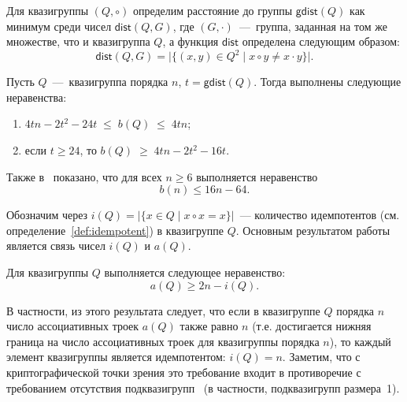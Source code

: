     \begin{definition}
        Для квазигруппы $(Q, \circ)$ определим расстояние до группы $\mathsf{gdist}(Q)$ как минимум среди чисел $\mathsf{dist}(Q, G)$, где $(G, \cdot)$~---~группа, заданная на том же множестве, что и квазигруппа $Q$, а функция $\mathsf{dist}$ определена следующим образом:
        \[
            \mathsf{dist}(Q, G) = \lvert \{(x, y) \in Q^2 \mid x \circ y \ne x \cdot y\} \rvert.
        \] 
    \end{definition}

    \begin{proposition}
        Пусть $Q$~---~квазигруппа порядка $n$, $t = \mathsf{gdist}(Q)$.
        Тогда выполнены следующие неравенства:
        \begin{enumerate}
            \item $4tn - 2t^2 - 24t \; \le \; b(Q) \; \le \; 4tn$;
            \item если $t \ge 24$, то $b(Q) \; \ge \; 4tn - 2t^2 - 16t$.
        \end{enumerate}
    \end{proposition}
    Также в~\cite{drapal1983quasigroups} показано, что для всех $n \ge 6$ выполняется неравенство 
    \[
        b(n) \le 16n - 64.
    \]

    Обозначим через $i(Q) = \lvert \{x \in Q \mid x \circ x = x\} \rvert$~--- количество идемпотентов (см. определение~\ref{def:idempotent}) в квазигруппе $Q$. 
    Основным результатом работы~\cite{groek11} является связь чисел $i(Q)$ и $a(Q)$.
    \begin{proposition}
    \label{proposition:idempotent}
        Для квазигруппы $Q$ выполняется следующее неравенство:
        \[
            a(Q) \ge 2n - i(Q).
        \]
    \end{proposition}
    В частности, из этого результата следует, что если в квазигруппе $Q$ порядка $n$ число ассоциативных троек $a(Q)$ также равно $n$ (т.е. достигается нижняя граница на число ассоциативных троек для квазигруппы порядка $n$), то каждый элемент квазигруппы является идемпотентом: $i(Q)=n$.
    Заметим, что с криптографической точки зрения это требование входит в противоречие с требованием отсутствия подквазигрупп~\cite{EdonR, artamonov18} (в частности, подквазигрупп размера~1).

